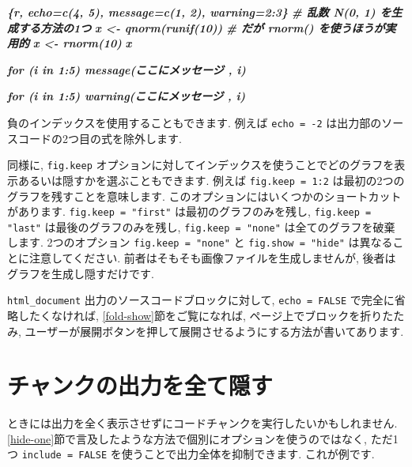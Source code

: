 \documentclass[
  11pt,
  lualatex,
  ja=standard]{bxjsreport}
\newenvironment{Shaded}{\begin{snugshade}}{\end{snugshade}}
\newcommand{\InformationTok}[1]{\textcolor[rgb]{0.56,0.35,0.01}{\textbf{\textit{#1}}}}
\begin{document}
\begin{Shaded}
\begin{Highlighting}[]
\InformationTok{\textasciigrave{}\textasciigrave{}\textasciigrave{}\{r, echo=c(4, 5), message=c(1, 2), warning=2:3\}}
\InformationTok{\# 乱数 N(0, 1) を生成する方法の1つ}
\InformationTok{x \textless{}{-} qnorm(runif(10))}
\InformationTok{\# だが rnorm() を使うほうが実用的}
\InformationTok{x \textless{}{-} rnorm(10)}
\InformationTok{x}

\InformationTok{for (i in 1:5) message(\textquotesingle{}ここにメッセージ \textquotesingle{}, i)}

\InformationTok{for (i in 1:5) warning(\textquotesingle{}ここにメッセージ \textquotesingle{}, i)}
\InformationTok{\textasciigrave{}\textasciigrave{}\textasciigrave{}}
\end{Highlighting}
\end{Shaded}

負のインデックスを使用することもできます. 例えば \texttt{echo = -2} は出力部のソースコードの2つ目の式を除外します.

同様に, \texttt{fig.keep} オプションに対してインデックスを使うことでどのグラフを表示あるいは隠すかを選ぶこともできます. 例えば \texttt{fig.keep = 1:2} は最初の2つのグラフを残すことを意味します. このオプションにはいくつかのショートカットがあります. \texttt{fig.keep = "first"} は最初のグラフのみを残し, \texttt{fig.keep = "last"} は最後のグラフのみを残し, \texttt{fig.keep = "none"} は全てのグラフを破棄します. 2つのオプション \texttt{fig.keep = "none"} と \texttt{fig.show = "hide"} は異なることに注意してください. 前者はそもそも画像ファイルを生成しませんが, 後者はグラフを生成し隠すだけです.

\texttt{html\_document} 出力のソースコードブロックに対して, \texttt{echo = FALSE} で完全に省略したくなければ, \ref{fold-show}節をご覧になれば, ページ上でブロックを折りたたみ, ユーザーが展開ボタンを押して展開させるようにする方法が書いてあります.

\hypertarget{hide-all}{%
\section{チャンクの出力を全て隠す}\label{hide-all}}

ときには出力を全く表示させずにコードチャンクを実行したいかもしれません. \ref{hide-one}節で言及したような方法で個別にオプションを使うのではなく, ただ1つ \texttt{include = FALSE} を使うことで出力全体を抑制できます. これが例です.
\end{document}
